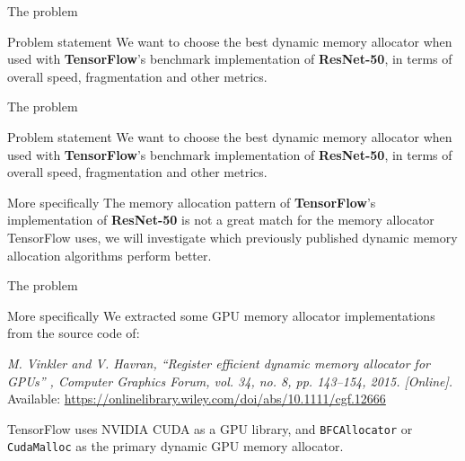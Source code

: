 \documentclass[10pt]{beamer}
\begin{document}
\begin{frame}[fragile]{The problem}


\begin{alertblock}{Problem statement}
 We want to choose the best dynamic memory allocator when used with \textbf{TensorFlow}'s benchmark implementation of \textbf{ResNet-50}, in terms of overall speed, fragmentation and other metrics.
\end{alertblock}
\end{frame}

\begin{frame}[fragile]{The problem}


\begin{alertblock}{Problem statement}
 We want to choose the best dynamic memory allocator when used with \textbf{TensorFlow}'s benchmark implementation of \textbf{ResNet-50}, in terms of overall speed, fragmentation and other metrics.
\end{alertblock}

\begin{exampleblock}{More specifically}
 The memory allocation pattern of \textbf{TensorFlow}'s implementation of \textbf{ResNet-50} is not a great match for the memory allocator TensorFlow uses, we will investigate which previously published dynamic memory allocation algorithms perform better.
\end{exampleblock}

\end{frame}

\begin{frame}[fragile]{The problem}


\begin{exampleblock}{More specifically}
We extracted some GPU memory allocator implementations from the source code of:

\textit{M. Vinkler and V. Havran, “Register efficient dynamic memory allocator for GPUs” , Computer Graphics Forum, vol. 34, no. 8, pp. 143–154, 2015. [Online].} Available: \url{https://onlinelibrary.wiley.com/doi/abs/10.1111/cgf.12666}

TensorFlow uses NVIDIA CUDA as a GPU library, and \texttt{BFCAllocator} or \texttt{CudaMalloc} as the primary dynamic GPU memory allocator.
\end{exampleblock}
\end{frame}
\end{document}
